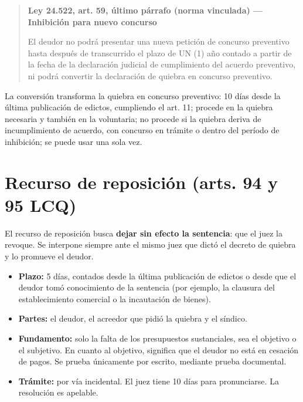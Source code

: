 \documentclass[12pt,oneside]{book}
\newenvironment{articulo}[1]
  {\begin{quote}\small\textbf{#1}\par\smallskip}
  {\end{quote}}
\begin{document}
\begin{articulo}{Ley 24.522, art. 59, último párrafo (norma vinculada) --- Inhibición para nuevo concurso}
El deudor no podrá presentar una nueva petición de concurso preventivo hasta después de transcurrido el plazo de UN (1) año contado a partir de la fecha de la declaración judicial de cumplimiento del acuerdo preventivo, ni podrá convertir la declaración de quiebra en concurso preventivo.
\end{articulo}

\begin{important}
La conversión transforma la quiebra en concurso preventivo: 10 días desde la última publicación de edictos, cumpliendo el art. 11; procede en la quiebra necesaria y también en la voluntaria; no procede si la quiebra deriva de incumplimiento de acuerdo, con concurso en trámite o dentro del período de inhibición; se puede usar una sola vez.
\end{important}

\section{Recurso de reposición (arts. 94 y 95 LCQ)}

El recurso de reposición busca \textbf{dejar sin efecto la sentencia}: que el juez la revoque. Se interpone siempre ante el mismo juez que dictó el decreto de quiebra y lo promueve el deudor.

\begin{itemize}
    \item \textbf{Plazo:} 5 días, contados desde la última publicación de edictos o desde que el deudor tomó conocimiento de la sentencia (por ejemplo, la clausura del establecimiento comercial o la incautación de bienes).
    \item \textbf{Partes:} el deudor, el acreedor que pidió la quiebra y el síndico.
    \item \textbf{Fundamento:} solo la falta de los presupuestos sustanciales, sea el objetivo o el subjetivo. En cuanto al objetivo, significa que el deudor no está en cesación de pagos. Se prueba únicamente por escrito, mediante prueba documental.
    \item \textbf{Trámite:} por vía incidental. El juez tiene 10 días para pronunciarse. La resolución es apelable.
\end{itemize}
\end{document}
